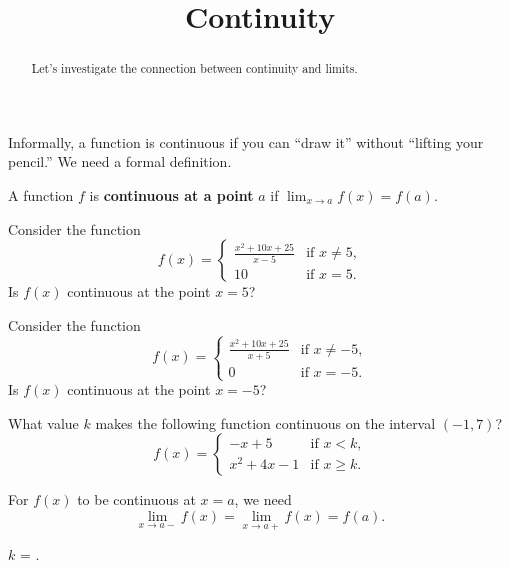 \documentclass{ximera}
\title{Continuity}
\begin{document}
\begin{abstract}
  Let's investigate the connection between continuity and limits.
\end{abstract}
\maketitle

Informally, a function is continuous if you can ``draw it'' without
``lifting your pencil.'' We need a formal definition.

\begin{definition} 
A function $f$ is \textbf{continuous at a point} $a$ if $\lim_{x\to a}
f(x) = f(a)$.
\end{definition}



\begin{question}
  Consider the function
\[
f(x) = 
\begin{cases} 
  \frac{x^2 + 10x + 25}{x-5} & \text{if $x\ne 5$,} \\ 
  10      & \text{if $x= 5$.}
\end{cases}
\]
Is $f(x)$ continuous at the point $x=5$?
\begin{multipleChoice}
\end{multipleChoice}  
\end{question}

\begin{question}
Consider the function
\[
f(x) = 
\begin{cases} 
  \frac{x^2 + 10x + 25}{x+5} & \text{if $x\ne -5$,} \\ 
  0      & \text{if $x= -5$.}
\end{cases}
\]
Is $f(x)$ continuous at the point $x=-5$?
\begin{multipleChoice}
\end{multipleChoice}  
\end{question}


\begin{question}
What value $k$ makes the following function continuous on the interval
$(-1,7)$?
\[
f(x) = 
\begin{cases} 
  -x+5 & \text{if $x< k$,} \\ 
  x^2+4x-1   & \text{if $x\ge k$.}
\end{cases}
\]
\begin{hint}
For $f(x)$ to be continuous at $x=a$, we need 
\[
\lim_{x\to a-}f(x) = \lim_{x\to a+}f(x) = f(a).
\]
\end{hint}
\begin{prompt}
$k$ = .
\end{prompt}
\end{question}
\end{document}
